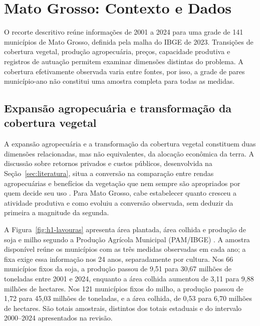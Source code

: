 \section{Mato Grosso: Contexto e Dados}
\label{sec:dados}

\begingroup


O recorte descritivo reúne informações de 2001 a 2024 para uma grade de 141 municípios de Mato Grosso, definida pela malha do IBGE de 2023. Transições de cobertura vegetal, produção agropecuária, preços, capacidade produtiva e registros de autuação permitem examinar dimensões distintas do problema. A cobertura efetivamente observada varia entre fontes, por isso, a grade de \Hobs{} pares município-ano não constitui uma amostra completa para todas as medidas.

\subsection{Expansão agropecuária e transformação da cobertura vegetal}
\label{subsec:mt-expansao}

A expansão agropecuária e a transformação da cobertura vegetal constituem duas dimensões relacionadas, mas não equivalentes, da alocação econômica da terra. A discussão sobre retornos privados e custos públicos, desenvolvida na Seção~\ref{sec:literatura}, situa a conversão na comparação entre rendas agropecuárias e benefícios da vegetação que nem sempre são apropriados por quem decide seu uso \cite{Angelsen2010}. Para Mato Grosso, cabe estabelecer quanto cresceu a atividade produtiva e como evoluiu a conversão observada, sem deduzir da primeira a magnitude da segunda.

A Figura~\ref{fig:h1-lavouras} apresenta área plantada, área colhida e produção de soja e milho segundo a Produção Agrícola Municipal (PAM/IBGE) \cite{IBGEPAM2026}. A amostra disponível reúne os municípios com as três medidas observadas em cada ano; a fixa exige essa informação nos 24 anos, separadamente por cultura. Nos 66 municípios fixos da soja, a produção passou de 9,51 para 30,67 milhões de toneladas entre 2001 e 2024, enquanto a área colhida aumentou de 3,11 para 9,88 milhões de hectares. Nos 121 municípios fixos do milho, a produção passou de 1,72 para 45,03 milhões de toneladas, e a área colhida, de 0,53 para 6,70 milhões de hectares. São totais amostrais, distintos dos totais estaduais e do intervalo 2000--2024 apresentados na revisão.

